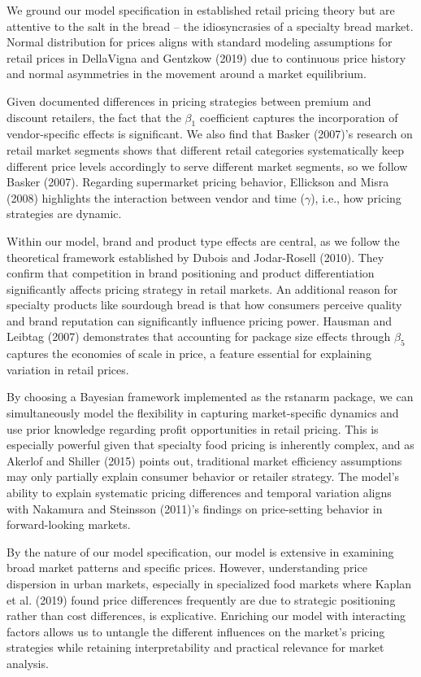 \documentclass[
  letterpaper,
  DIV=11,
  numbers=noendperiod]{scrartcl}
\begin{document}
We ground our model specification in established retail pricing theory
but are attentive to the salt in the bread -- the idiosyncrasies of a
specialty bread market. Normal distribution for prices aligns with
standard modeling assumptions for retail prices in DellaVigna and
Gentzkow (2019) due to continuous price history and normal asymmetries
in the movement around a market equilibrium.

Given documented differences in pricing strategies between premium and
discount retailers, the fact that the \(\beta_1\) coefficient captures
the incorporation of vendor-specific effects is significant. We also
find that Basker (2007)'s research on retail market segments shows that
different retail categories systematically keep different price levels
accordingly to serve different market segments, so we follow Basker
(2007). Regarding supermarket pricing behavior, Ellickson and Misra
(2008) highlights the interaction between vendor and time (\(\gamma\)),
i.e., how pricing strategies are dynamic.

Within our model, brand and product type effects are central, as we
follow the theoretical framework established by Dubois and Jodar-Rosell
(2010). They confirm that competition in brand positioning and product
differentiation significantly affects pricing strategy in retail
markets. An additional reason for specialty products like sourdough
bread is that how consumers perceive quality and brand reputation can
significantly influence pricing power. Hausman and Leibtag (2007)
demonstrates that accounting for package size effects through
\(\beta_5\) captures the economies of scale in price, a feature
essential for explaining variation in retail prices.

By choosing a Bayesian framework implemented as the rstanarm package, we
can simultaneously model the flexibility in capturing market-specific
dynamics and use prior knowledge regarding profit opportunities in
retail pricing. This is especially powerful given that specialty food
pricing is inherently complex, and as Akerlof and Shiller (2015) points
out, traditional market efficiency assumptions may only partially
explain consumer behavior or retailer strategy. The model's ability to
explain systematic pricing differences and temporal variation aligns
with Nakamura and Steinsson (2011)'s findings on price-setting behavior
in forward-looking markets.

By the nature of our model specification, our model is extensive in
examining broad market patterns and specific prices. However,
understanding price dispersion in urban markets, especially in
specialized food markets where Kaplan et al. (2019) found price
differences frequently are due to strategic positioning rather than cost
differences, is explicative. Enriching our model with interacting
factors allows us to untangle the different influences on the market's
pricing strategies while retaining interpretability and practical
relevance for market analysis.
\end{document}
